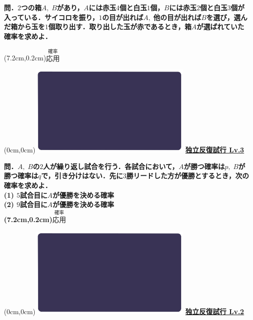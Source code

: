 \documentclass[10pt,
fleqn,
dvipdfmx,
uplatex
]{jsarticle}
\begin{document}
\small 
\bf\boldmath 問．$2$つの箱$A,\;B$があり，$A$には赤玉$4$個と白玉$1$個，$B$には赤玉$2$個と白玉$3$個が入っている．サイコロを振り，$1$の目が出れば$A,\;$他の目が出れば$B$を選び，選んだ箱から玉を$1$個取り出す．取り出した玉が赤であるとき，箱$A$が選ばれていた確率を求めよ．

\at(7.2cm,0.2cm){\small\color{bradorange}$\overset{\text{確率}}{\text{応用}}$}


\newpage



\at(0cm,0cm){\includegraphics[width=8cm,bb=0 0 1920 1080]{./youtube/thumbnails/templates/smart_background/確率.jpeg}}
{\color{orange}\bf\boldmath\LARGE\underline{独立反復試行 Lv.3 }}\vspace{0.3zw}

\small 
\bf\boldmath 問．$A,\;B$の$2$人が繰り返し試合を行う．各試合において，$A$が勝つ確率は$p,\;B$が勝つ確率は$q$で，引き分けはない．先に$3$勝リードした方が優勝とするとき，次の確率を求めよ．\\
(1)  $5$試合目に$A$が優勝を決める確率\\
(2)  $9$試合目に$A$が優勝を決める確率\\

\at(7.2cm,0.2cm){\small\color{bradorange}$\overset{\text{確率}}{\text{応用}}$}


\newpage



\at(0cm,0cm){\includegraphics[width=8cm,bb=0 0 1920 1080]{./youtube/thumbnails/templates/smart_background/確率.jpeg}}
{\color{orange}\bf\boldmath\LARGE\underline{独立反復試行 Lv.2 }}\vspace{0.3zw}
\end{document}
